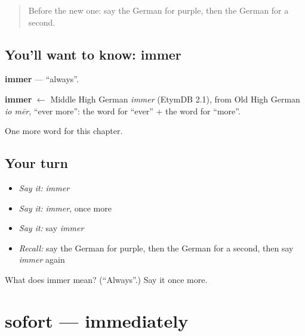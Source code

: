 \label{lesson:GE-C94-immer}



\begin{quote}
Before the new one: say the German for purple, then the German for a second.
\end{quote}

\subsection*{You'll want to know: immer}
\textbf{immer} — \textquotedblleft{}always\textquotedblright{}.

\begin{cousinweb}
\textbf{immer} $\leftarrow$ Middle High German \emph{immer} (EtymDB 2.1), from Old High German \emph{io mēr}, \textquotedblleft{}ever more\textquotedblright{}: the word for \textquotedblleft{}ever\textquotedblright{} + the word for \textquotedblleft{}more\textquotedblright{}.
\end{cousinweb}

\begin{grammarlens}[title={What you've built}]
One more word for this chapter.
\end{grammarlens}

\subsection*{Your turn}
\begin{itemize}
\raggedright
  \item \emph{Say it:} \emph{immer}
  \item \emph{Say it:} \emph{immer}, once more
  \item \emph{Say it:} say \emph{immer}
  \item \emph{Recall:} say the German for purple, then the German for a second, then say \emph{immer} again
\end{itemize}

\begin{tcolorbox}[breakable,colback=teal!4,colframe=teal!35!black,title={Before you move on}]
What does immer mean? (\textquotedblleft{}Always\textquotedblright{}.) Say it once more.
\end{tcolorbox}
\section[sofort]{sofort — immediately}

\label{lesson:GE-C94-sofort}




